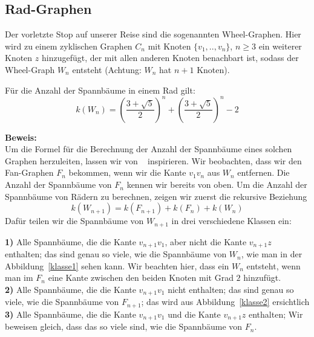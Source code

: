 \subsection{Rad-Graphen}
Der vorletzte Stop auf unserer Reise sind die sogenannten Wheel-Graphen. Hier wird zu einem zyklischen Graphen $C_n$ mit Knoten $\{v_1,..,v_n\}$, $n \geq 3$ ein weiterer Knoten $z$ hinzugefügt, der mit allen anderen Knoten benachbart ist, sodass der Wheel-Graph $W_{n}$ entsteht (Achtung: $W_n$ hat $n+1$ Knoten).
\begin{Tm}
Für die Anzahl der Spannbäume in einem Rad gilt:
\begin{equation}
 \mathit{k}\left(W_n\right) = \left(\frac{3+\sqrt{5}}{2}\right)^n+\left(\frac{3+\sqrt{5}}{2}\right)^n-2
 \label{wn}
\end{equation}
\end{Tm}
\textbf{Beweis:}\\
Um die Formel für die Berechnung der Anzahl der Spannbäume eines solchen Graphen herzuleiten, lassen wir von ~\cite{sedlacek_1970} inspirieren.
Wir beobachten, dass wir den Fan-Graphen $F_n$ bekommen, wenn wir die Kante $v_1v_n$ aus $W_n$ entfernen.
Die Anzahl der Spannbäume von $F_n$ kennen wir bereits von oben.
Um die Anzahl der Spannbäume von Rädern zu berechnen, zeigen wir zuerst die rekursive Beziehung
\begin{equation}
 \mathit{k}\left(W_{n+1}\right) = \mathit{k}\left(F_{n+1}\right) + \mathit{k}\left(F_n\right) + \mathit{k}\left(W_n\right)
\end{equation}
Dafür teilen wir die Spannbäume von $W_{n+1}$ in drei verschiedene Klassen ein:\\
\par
\begingroup
\leftskip=20pt
\rightskip=20pt
\noindent
\textbf{1)} Alle Spannbäume, die die Kante $v_{n+1}v_1$, aber nicht die Kante $v_{n+1}z$ enthalten; das sind genau so viele, wie die Spannbäume von $W_n$, wie man in der Abbildung~\ref{klasse1} sehen kann. Wir beachten hier, dass ein $W_n$ entsteht, wenn man im $F_n$ eine Kante zwischen den beiden Knoten mit Grad $2$ hinzufügt.\\
\textbf{2)} Alle Spannbäume, die die Kante $v_{n+1}v_1$ nicht enthalten; das sind genau so viele, wie die Spannbäume von $F_{n+1}$; das wird aus Abbildung~\ref{klasse2} ersichtlich\\
\textbf{3)} Alle Spannbäume, die die Kante $v_{n+1}v_1$ und die Kante $v_{n+1}z$ enthalten; Wir beweisen gleich, dass das so viele sind, wie die Spannbäume von $F_n$.\\
